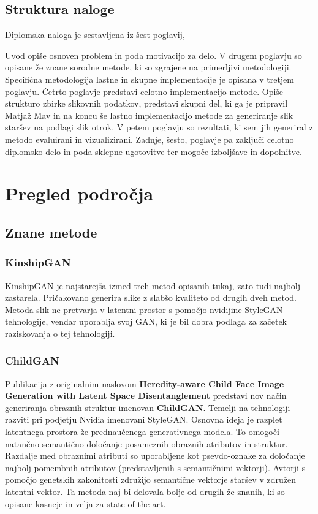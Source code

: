 \documentclass[a4paper,12pt,openright]{book}
\begin{document}
\section{Struktura naloge}
Diplomska naloga je sestavljena iz šest poglavij,

Uvod opiše osnoven problem in poda motivacijo za delo. V drugem poglavju so opisane že znane sorodne metode, ki so zgrajene na primerljivi metodologiji. Specifična metodologija lastne in skupne implementacije je opisana v tretjem poglavju. Četrto poglavje predstavi celotno implementacijo metode. Opiše strukturo zbirke slikovnih podatkov, predstavi skupni del, ki ga je pripravil Matjaž Mav in na koncu še lastno implementacijo metode za generiranje slik staršev na podlagi slik otrok. V petem poglavju so rezultati, ki sem jih generiral z metodo evaluirani in vizualizirani. Zadnje, šesto, poglavje pa zaključi celotno diplomsko delo in poda sklepne ugotovitve ter mogoče izboljšave in dopolnitve.

\chapter{Pregled področja}

\section{Znane metode}
\subsection{KinshipGAN}
KinshipGAN \cite{zkan2018KinshipganSO} je najstarejša izmed treh metod opisanih tukaj, zato tudi najbolj zastarela. Pričakovano generira slike z slabšo kvaliteto od drugih dveh metod. Metoda slik ne pretvarja v latentni prostor s pomočjo nvidijine StyleGAN tehnologije, vendar uporablja svoj GAN, ki je bil dobra podlaga za začetek raziskovanja o tej tehnologiji. 
\subsection{ChildGAN}
Publikacija z originalnim naslovom \textbf{Heredity-aware Child Face Image Generation with Latent Space Disentanglement} \cite{cui2021heredity} predstavi nov način generiranja obraznih struktur imenovan \textbf{ChildGAN}. Temelji na tehnologiji razviti pri podjetju Nvidia imenovani StyleGAN. Osnovna ideja je razplet latentnega prostora že prednaučenega generativnega modela. To omogoči natančno semantično določanje posameznih obraznih atributov in struktur. Razdalje med obraznimi atributi so uporabljene kot psevdo-oznake za določanje najbolj pomembnih atributov (predstavljenih s semantičnimi vektorji). Avtorji s pomočjo genetskih zakonitosti združijo semantične vektorje staršev v združen latentni vektor. Ta metoda naj bi delovala bolje od drugih že znanih, ki so opisane kasneje in velja za state-of-the-art.
\end{document}
